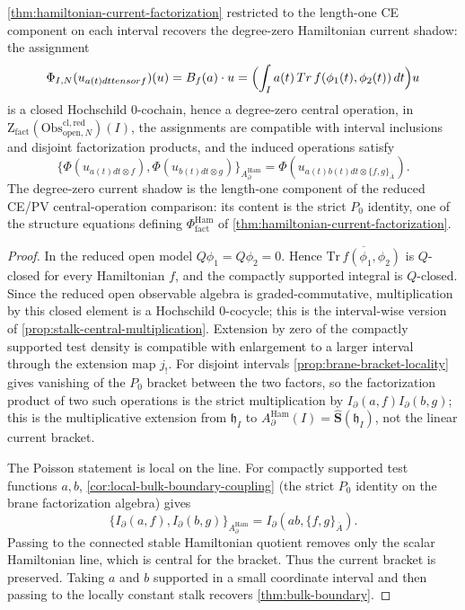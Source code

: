 \documentclass[11pt]{memoir}
\begin{document}
\begin{thm}\label{thm:hamiltonian-current-center-lift}
  \ref{thm:hamiltonian-current-factorization} restricted to the
  length-one CE component on each interval recovers the degree-zero
  Hamiltonian current shadow: the assignment
  $$\Phi_{I,N}(u_{a(t)dt\otimes f})(u)=B_f(a)\cdot u
    =\Bigl(\int_I a(t)\,
      \overline{\mathrm{Tr}\,f(\phi_1(t),\phi_2(t))}\,dt\Bigr)u$$
  is a closed Hochschild $0$-cochain, hence a degree-zero central
  operation, in $\mathrm Z_{\mathrm{fact}}
  (\mathrm{Obs}^{\mathrm{cl,red}}_{\mathrm{open},N})(I)$, the assignments
  are compatible with interval inclusions and disjoint factorization
  products, and the induced operations satisfy
  $$\{\Phi(u_{a(t)dt\otimes f}),\Phi(u_{b(t)dt\otimes g})\}_{A_\partial^{\mathrm{Ham}}}
    =\Phi(u_{a(t)b(t)dt\otimes\{f,g\}_{\bar A}}).$$
  The degree-zero current shadow is the length-one component of the
  reduced CE/PV central-operation comparison: its content is the strict
  $P_0$ identity, one of the structure equations defining
  $\Phi^{\mathrm{Ham}}_{\mathrm{fact}}$ of
  \ref{thm:hamiltonian-current-factorization}.
\end{thm}

\begin{proof}
  In the reduced open model $Q\phi_1=Q\phi_2=0$. Hence
  $\overline{\mathrm{Tr}\,f(\phi_1,\phi_2)}$ is $Q$-closed for every
  Hamiltonian $f$, and the compactly supported integral is $Q$-closed.
  Since the reduced open observable algebra is graded-commutative,
  multiplication by this closed element is a Hochschild $0$-cocycle;
  this is the interval-wise version of
  \ref{prop:stalk-central-multiplication}. Extension by zero of the
  compactly supported test density is compatible with enlargement to a larger interval
  through the extension map \(j_!\).
  For disjoint intervals \ref{prop:brane-bracket-locality} gives
  vanishing of the $P_0$ bracket between the two factors, so the
  factorization product of two such operations is the strict
  multiplication by $I_\partial(a,f)I_\partial(b,g)$; this is the
  multiplicative extension from $\mathfrak h_I$ to
  $A_\partial^{\mathrm{Ham}}(I)=\widehat{\mathbf S}(\mathfrak h_I)$, not
  the linear current bracket.

  The Poisson statement is local on the line. For compactly supported
  test functions $a,b$,
  \ref{cor:local-bulk-boundary-coupling} (the strict $P_0$ identity
  on the brane factorization algebra) gives
  $$\{I_\partial(a,f),I_\partial(b,g)\}_{A_\partial^{\mathrm{Ham}}}
    =I_\partial(ab,\{f,g\}_{\bar A}).$$
  Passing to the connected stable Hamiltonian quotient removes only
  the scalar Hamiltonian line, which is central for the bracket. Thus
  the current bracket is preserved. Taking $a$ and $b$ supported in a
  small coordinate interval and then passing to the locally constant
  stalk recovers \ref{thm:bulk-boundary}.
\end{proof}
\end{document}
